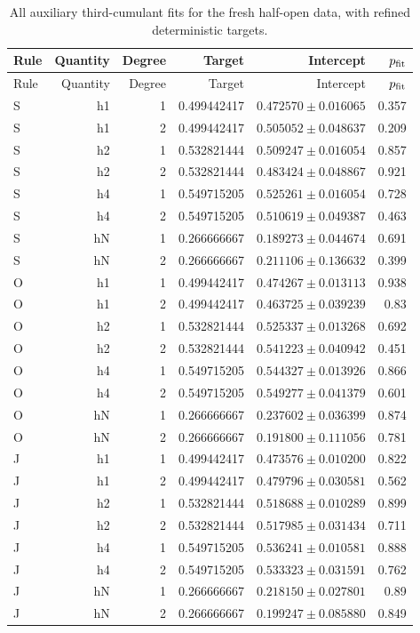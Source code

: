 {\small\setlength{\tabcolsep}{3.5pt}
\begin{longtable}{lrrrrr}
\caption{All auxiliary third-cumulant fits for the fresh half-open data, with refined deterministic targets.}\\
\toprule
Rule & Quantity & Degree & Target & Intercept & $p_{\rm fit}$\\
\midrule
\endfirsthead
\toprule
Rule & Quantity & Degree & Target & Intercept & $p_{\rm fit}$\\
\midrule
\endhead
\bottomrule\endfoot
S & h1 & 1 & 0.499442417 & $0.472570\pm0.016065$ & 0.357\\
S & h1 & 2 & 0.499442417 & $0.505052\pm0.048637$ & 0.209\\
S & h2 & 1 & 0.532821444 & $0.509247\pm0.016054$ & 0.857\\
S & h2 & 2 & 0.532821444 & $0.483424\pm0.048867$ & 0.921\\
S & h4 & 1 & 0.549715205 & $0.525261\pm0.016054$ & 0.728\\
S & h4 & 2 & 0.549715205 & $0.510619\pm0.049387$ & 0.463\\
S & hN & 1 & 0.266666667 & $0.189273\pm0.044674$ & 0.691\\
S & hN & 2 & 0.266666667 & $0.211106\pm0.136632$ & 0.399\\
O & h1 & 1 & 0.499442417 & $0.474267\pm0.013113$ & 0.938\\
O & h1 & 2 & 0.499442417 & $0.463725\pm0.039239$ & 0.83\\
O & h2 & 1 & 0.532821444 & $0.525337\pm0.013268$ & 0.692\\
O & h2 & 2 & 0.532821444 & $0.541223\pm0.040942$ & 0.451\\
O & h4 & 1 & 0.549715205 & $0.544327\pm0.013926$ & 0.866\\
O & h4 & 2 & 0.549715205 & $0.549277\pm0.041379$ & 0.601\\
O & hN & 1 & 0.266666667 & $0.237602\pm0.036399$ & 0.874\\
O & hN & 2 & 0.266666667 & $0.191800\pm0.111056$ & 0.781\\
J & h1 & 1 & 0.499442417 & $0.473576\pm0.010200$ & 0.822\\
J & h1 & 2 & 0.499442417 & $0.479796\pm0.030581$ & 0.562\\
J & h2 & 1 & 0.532821444 & $0.518688\pm0.010289$ & 0.899\\
J & h2 & 2 & 0.532821444 & $0.517985\pm0.031434$ & 0.711\\
J & h4 & 1 & 0.549715205 & $0.536241\pm0.010581$ & 0.888\\
J & h4 & 2 & 0.549715205 & $0.533323\pm0.031591$ & 0.762\\
J & hN & 1 & 0.266666667 & $0.218150\pm0.027801$ & 0.89\\
J & hN & 2 & 0.266666667 & $0.199247\pm0.085880$ & 0.849\\
\end{longtable}}
